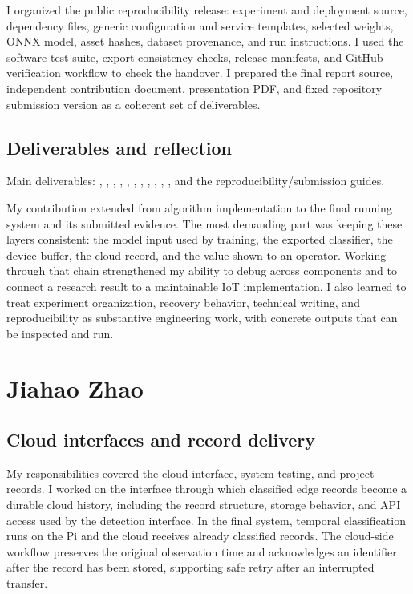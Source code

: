 \documentclass[conference,a4paper]{IEEEtran}
\newenvironment{evidence}{\par\smallskip\begingroup\footnotesize\raggedright\noindent}{\par\endgroup}
\begin{document}
I organized the public reproducibility release: experiment and deployment source, dependency files, generic configuration and service templates, selected weights, ONNX model, asset hashes, dataset provenance, and run instructions. I used the software test suite, export consistency checks, release manifests, and GitHub verification workflow to check the handover. I prepared the final report source, independent contribution document, presentation PDF, and fixed repository submission version as a coherent set of deliverables.

\subsection{Deliverables and reflection}

\begin{evidence}
Main deliverables: , , , , , , , , , , , and the reproducibility/submission guides.
\end{evidence}

My contribution extended from algorithm implementation to the final running system and its submitted evidence. The most demanding part was keeping these layers consistent: the model input used by training, the exported classifier, the device buffer, the cloud record, and the value shown to an operator. Working through that chain strengthened my ability to debug across components and to connect a research result to a maintainable IoT implementation. I also learned to treat experiment organization, recovery behavior, technical writing, and reproducibility as substantive engineering work, with concrete outputs that can be inspected and run.

\section{Jiahao Zhao}
\subsection{Cloud interfaces and record delivery}

My responsibilities covered the cloud interface, system testing, and project records. I worked on the interface through which classified edge records become a durable cloud history, including the record structure, storage behavior, and API access used by the detection interface. In the final system, temporal classification runs on the Pi and the cloud receives already classified records. The cloud-side workflow preserves the original observation time and acknowledges an identifier after the record has been stored, supporting safe retry after an interrupted transfer.
\end{document}
